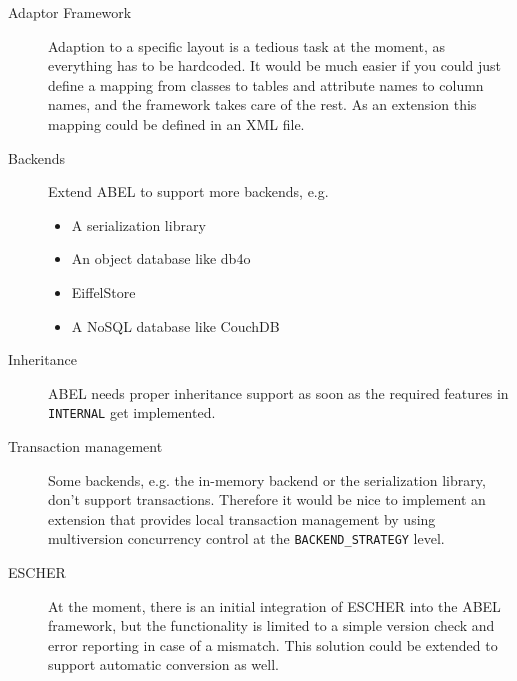 \begin{description}
 \item [Adaptor Framework] Adaption to a specific layout is a tedious task at the moment, as everything has to be hardcoded. 
It would be much easier if you could just define a mapping from classes to tables and attribute names to column names, and the framework takes care of the rest.
As an extension this mapping could be defined in an XML file.
\item [Backends] Extend ABEL to support more backends, e.g.
\begin{itemize}
 \item A serialization library
 \item An object database like db4o
 \item EiffelStore
 \item A NoSQL database like CouchDB
\end{itemize}
 \item [Inheritance] ABEL needs proper inheritance support as soon as the required features in \lstinline!INTERNAL! get implemented.
\item [Transaction management] Some backends, e.g. the in-memory backend or the serialization library, don't support transactions.
 Therefore it would be nice to implement an extension that provides local transaction management by using multiversion concurrency control at the \lstinline!BACKEND_STRATEGY! level.
\item [ESCHER] At the moment, there is an initial integration of ESCHER into the ABEL framework, but the functionality is limited to a simple version check and error reporting in case of a mismatch.
 This solution could be extended to support automatic conversion as well.
\end{description}
